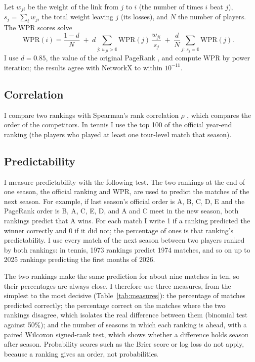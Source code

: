 \documentclass[11pt]{article}
\begin{document}
Let $w_{ji}$ be the weight of the link from $j$ to $i$ (the number of times $i$ beat $j$), $s_j = \sum_i w_{ji}$ the total weight leaving $j$ (its losses), and $N$ the number of players. The WPR scores solve
\begin{equation}
\mathrm{WPR}(i) = \frac{1-d}{N} \;+\; d\sum_{j:\,w_{ji}>0} \mathrm{WPR}(j)\,\frac{w_{ji}}{s_j} \;+\; \frac{d}{N} \sum_{j:\,s_j=0} \mathrm{WPR}(j).
\end{equation}
I use $d = 0.85$, the value of the original PageRank \citep{brin1998}, and compute WPR by power iteration; the results agree with NetworkX \citep{hagberg2008} to within $10^{-11}$.

\subsection{Correlation}
I compare two rankings with Spearman's rank correlation $\rho$ \citep{spearman1904}, which compares the order of the competitors. In tennis I use the top 100 of the official year-end ranking (the players who played at least one tour-level match that season).

\subsection{Predictability}
I measure predictability with the following test. The two rankings at the end of one season, the official ranking and WPR, are used to predict the matches of the next season. For example, if last season's official order is A, B, C, D, E and the PageRank order is B, A, C, E, D, and A and C meet in the new season, both rankings predict that A wins. For each match I write 1 if a ranking predicted the winner correctly and 0 if it did not; the percentage of ones is that ranking's predictability. I use every match of the next season between two players ranked by both rankings: in tennis, 1973 rankings predict 1974 matches, and so on up to 2025 rankings predicting the first months of 2026.

The two rankings make the same prediction for about nine matches in ten, so their percentages are always close. I therefore use three measures, from the simplest to the most decisive (Table~\ref{tab:measures}): the percentage of matches predicted correctly; the percentage correct on the matches where the two rankings disagree, which isolates the real difference between them (binomial test against 50\%); and the number of seasons in which each ranking is ahead, with a paired Wilcoxon signed-rank test, which shows whether a difference holds season after season. Probability scores such as the Brier score or log loss do not apply, because a ranking gives an order, not probabilities.
\end{document}

